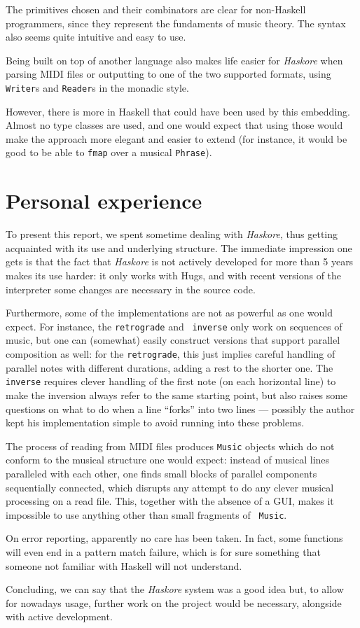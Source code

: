 \documentclass[a4paper,10pt]{article}
\begin{document}
The primitives chosen and their combinators are clear for
non-Haskell programmers, since they represent the fundaments of
music theory. The syntax also seems quite intuitive and easy to
use.

Being built on top of another language also makes life easier for
\emph{Haskore} when parsing MIDI files or outputting to one of the
two supported formats, using {\tt Writer}s and {\tt Reader}s in
the monadic style.

However, there is more in Haskell that could have been used by
this embedding. Almost no type classes are used, and one would
expect that using those would make the approach more elegant and
easier to extend (for instance, it would be good to be able to
{\tt fmap} over a musical {\tt Phrase}).

\section{Personal experience}
To present this report, we spent sometime dealing with
\emph{Haskore}, thus getting acquainted with its use and
underlying structure. The immediate impression one gets is that
the fact that \emph{Haskore} is not actively developed for more
than 5 years makes its use harder: it only works with Hugs, and
with recent versions of the interpreter some changes are necessary
in the source code.

Furthermore, some of the implementations are not as powerful as
one would expect. For instance, the {\tt retrograde} and {\tt
inverse} only work on sequences of music, but one can (somewhat)
easily construct versions that support parallel composition as
well: for the {\tt retrograde}, this just implies careful handling
of parallel notes with different durations, adding a rest to the
shorter one. The {\tt inverse} requires clever handling of the
first note (on each horizontal line) to make the inversion always
refer to the same starting point, but also raises some questions on
what to do when a line ``forks'' into two lines --- possibly the
author kept his implementation simple to avoid running into these
problems.

The process of reading from MIDI files produces {\tt Music}
objects which do not conform to the musical structure one would
expect: instead of musical lines paralleled with each other, one
finds small blocks of parallel components sequentially connected,
which disrupts any attempt to do any  clever musical processing on
a read file. This, together with the absence of a GUI, makes it
impossible to use anything other than small fragments of {\tt
Music}.

On error reporting, apparently no care has been taken. In fact,
some functions will even end in a pattern match failure, which is
for sure something that someone not familiar with Haskell will not
understand.

Concluding, we can say that the \emph{Haskore} system was a good
idea but, to allow for nowadays usage, further work on the project
would be necessary, alongside with active development.
\end{document}

